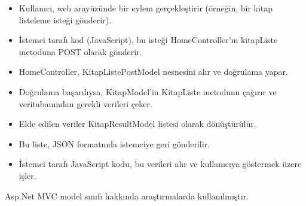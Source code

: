 \vspace{1\baselineskip} %

\begin{itemize}
	\item Kullanıcı, web arayüzünde bir eylem gerçekleştirir (örneğin, bir kitap listeleme isteği gönderir).
	\item İstemci tarafı kod (JavaScript), bu isteği HomeController'ın kitapListe metoduna POST olarak gönderir.
	\item HomeController, KitapListePostModel nesnesini alır ve doğrulama yapar.
	\item Doğrulama başarılıysa, KitapModel'in KitapListe metodunu çağırır ve veritabanından gerekli verileri çeker.
	\item Elde edilen veriler KitapResultModel listesi olarak dönüştürülür.
	\item Bu liste, JSON formatında istemciye geri gönderilir.
	\item İstemci tarafı JavaScript kodu, bu verileri alır ve kullanıcıya göstermek üzere işler.
\end{itemize}
	
	Asp.Net MVC model sınıfı hakkında araştırmalarda kullanılmıştır. \cite{kurtonline} \newline
\cite{ccelik2018oncul} \cite{tuzemen2014akademik} \cite{keskin2014facebook}

	
